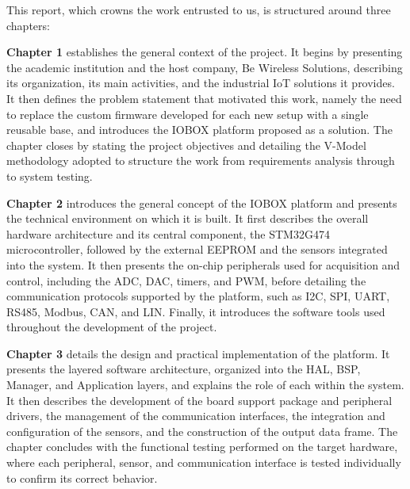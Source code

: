 This report, which crowns the work entrusted to us, is structured around three chapters:

\textbf{Chapter 1} establishes the general context of the project. It begins by presenting the academic institution and the host company, Be Wireless Solutions, describing its organization, its main activities, and the industrial IoT solutions it provides. It then defines the problem statement that motivated this work, namely the need to replace the custom firmware developed for each new setup with a single reusable base, and introduces the IOBOX platform proposed as a solution. The chapter closes by stating the project objectives and detailing the V-Model methodology adopted to structure the work from requirements analysis through to system testing.

    \textbf{Chapter 2} introduces the general concept of the IOBOX platform and presents the technical environment on which it is built. It first describes the overall hardware architecture and its central component, the STM32G474 microcontroller, followed by the external EEPROM and the sensors integrated into the system. It then presents the on-chip peripherals used for acquisition and control, including the ADC, DAC, timers, and PWM, before detailing the communication protocols supported by the platform, such as I2C, SPI, UART, RS485, Modbus, CAN, and LIN. Finally, it introduces the software tools used throughout the development of the project.

    \textbf{Chapter 3} details the design and practical implementation of the platform. It presents the layered software architecture, organized into the HAL, BSP, Manager, and Application layers, and explains the role of each within the system. It then describes the development of the board support package and peripheral drivers, the management of the communication interfaces, the integration and configuration of the sensors, and the construction of the output data frame. The chapter concludes with the functional testing performed on the target hardware, where each peripheral, sensor, and communication interface is tested individually to confirm its correct behavior.
